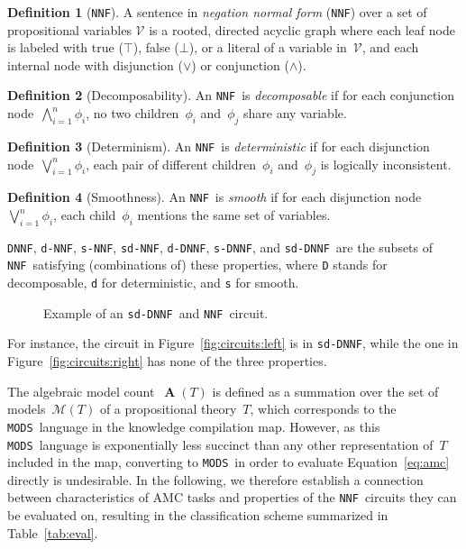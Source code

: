 \documentclass{article}
\theoremstyle{plain}
\theoremstyle{definition}
\newtheorem{definition}{Definition}
\newcommand{\NNF}{{\tt NNF}}
\newcommand{\dNNF}{{\tt d-NNF}}
\newcommand{\sNNF}{{\tt s-NNF}}
\newcommand{\DNNF}{{\tt DNNF}}
\newcommand{\dDNNF}{{\tt d-DNNF}}
\newcommand{\sDNNF}{{\tt s-DNNF}}
\newcommand{\sdDNNF}{{\tt sd-DNNF}}
\newcommand{\sdNNF}{{\tt sd-NNF}}
\newcommand{\MODS}{{\tt MODS}}
\begin{document}
\begin{definition}[\NNF]
A sentence in \emph{negation normal form} (\NNF) over a set of propositional variables $\mathcal{V}$
is a rooted, directed acyclic graph where each leaf node is labeled
with true ($\top$), false ($\bot$), or a literal of a variable in~$\mathcal{V}$, and
each internal node with disjunction ($\vee$) or conjunction ($\wedge$). 
\end{definition}

\begin{definition}[Decomposability]
An \NNF\ is \emph{decomposable} if for each conjunction
node~$\bigwedge_{i=1}^n\phi_i$, no two children~$\phi_i$ and~$\phi_j$
share any variable. 
\end{definition}
\begin{definition}[Determinism]
An \NNF\ is \emph{deterministic} if for each disjunction
node~$\bigvee_{i=1}^n\phi_i$, each pair of different 
children~$\phi_i$ and~$\phi_j$ is logically inconsistent.
\end{definition}
\begin{definition}[Smoothness]
An \NNF\ is \emph{smooth} if for each disjunction
node $\bigvee_{i=1}^n\phi_i$, each child~$\phi_i$ mentions the
same set of variables.
\end{definition}
\DNNF, \dNNF, \sNNF, \sdNNF, \dDNNF, \sDNNF, and \sdDNNF\ are the
subsets of \NNF\ satisfying  (combinations of)
these properties, where \texttt{D} stands for decomposable, \texttt{d} for
deterministic, and \texttt{s} for smooth. 
\begin{figure}
\center
\subfloat[\sdDNNF]{\label{fig:circuits:left} \texttt{[image: sdDNNF.pdf]}}
\subfloat[\NNF]{\label{fig:circuits:right} \texttt{[image: NNF.pdf]}}
\caption{Example of an \sdDNNF\ and \NNF\ circuit.}
\label{fig:circuits}
\end{figure}
For instance, the circuit in Figure~\ref{fig:circuits:left} is in \sdDNNF,
while the one in Figure~\ref{fig:circuits:right} has none of the three properties.



The algebraic model count~$\operatorname{\mathbf{A}}(T)$ is defined as a summation over the set of
models~$\mathcal{M}(T)$ of a propositional theory~$T$, which corresponds to the \MODS\ language in
the knowledge compilation map. However, as this \MODS\ language is
exponentially less succinct than any other representation of~$T$
included in the map,
converting to \MODS\ in order to evaluate Equation~\eqref{eq:amc}
directly is undesirable.
 In the following, we therefore establish a connection between
 characteristics of AMC
 tasks and properties of the \NNF\ circuits they can be evaluated on,
 resulting in the classification scheme summarized in Table~\ref{tab:eval}.
\end{document}
